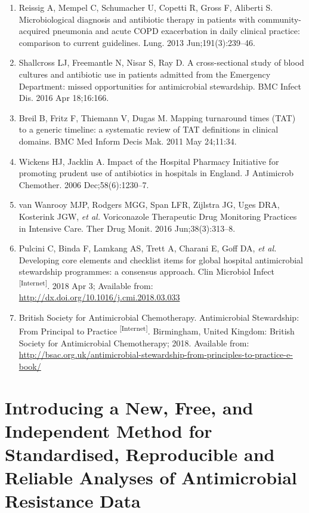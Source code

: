 \documentclass[
]{book}
\begin{document}
\begin{enumerate}
\item
  Reissig A, Mempel C, Schumacher U, Copetti R, Gross F, Aliberti S. Microbiological diagnosis and antibiotic therapy in patients with community-acquired pneumonia and acute COPD exacerbation in daily clinical practice: comparison to current guidelines. Lung. 2013 Jun;191(3):239--46.
\item
  Shallcross LJ, Freemantle N, Nisar S, Ray D. A cross-sectional study of blood cultures and antibiotic use in patients admitted from the Emergency Department: missed opportunities for antimicrobial stewardship. BMC Infect Dis. 2016 Apr 18;16:166.
\item
  Breil B, Fritz F, Thiemann V, Dugas M. Mapping turnaround times (TAT) to a generic timeline: a systematic review of TAT definitions in clinical domains. BMC Med Inform Decis Mak. 2011 May 24;11:34.
\item
  Wickens HJ, Jacklin A. Impact of the Hospital Pharmacy Initiative for promoting prudent use of antibiotics in hospitals in England. J Antimicrob Chemother. 2006 Dec;58(6):1230--7.
\item
  van Wanrooy MJP, Rodgers MGG, Span LFR, Zijlstra JG, Uges DRA, Kosterink JGW, \emph{et al.} Voriconazole Therapeutic Drug Monitoring Practices in Intensive Care. Ther Drug Monit. 2016 Jun;38(3):313--8.
\item
  Pulcini C, Binda F, Lamkang AS, Trett A, Charani E, Goff DA, \emph{et al.} Developing core elements and checklist items for global hospital antimicrobial stewardship programmes: a consensus approach. Clin Microbiol Infect \textsuperscript{{[}Internet{]}}. 2018 Apr 3; Available from: \url{http://dx.doi.org/10.1016/j.cmi.2018.03.033}
\item
  British Society for Antimicrobial Chemotherapy. Antimicrobial Stewardship: From Principal to Practice \textsuperscript{{[}Internet{]}}. Birmingham, United Kingdom: British Society for Antimicrobial Chemotherapy; 2018. Available from: \url{http://bsac.org.uk/antimicrobial-stewardship-from-principles-to-practice-e-book/}
\end{enumerate}

\hypertarget{introducing-method}{%
\chapter{Introducing a New, Free, and Independent Method for Standardised, Reproducible and Reliable Analyses of Antimicrobial Resistance Data}\label{introducing-method}}
\end{document}
